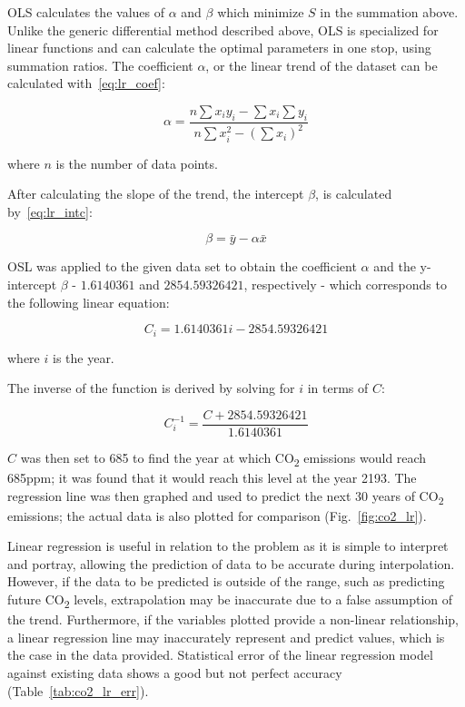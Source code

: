 \documentclass{mcmthesis}
\begin{document}
    OLS calculates the values of $\alpha$ and $\beta$ which minimize $S$ in the summation above.
    Unlike the generic differential method described above, OLS is specialized for linear functions and can calculate the optimal parameters in one stop, using summation ratios.
    The coefficient $\alpha$, or the linear trend of the dataset can be calculated with~\eqref{eq:lr_coef}:

    \begin{equation}
        \alpha = \frac{n \sum x_i y_i - \sum x_i \sum y_i }{n \sum x^2_i - (\sum x_i)^2}
        \label{eq:lr_coef}
    \end{equation}

    \noindent where $n$ is the number of data points.

    After calculating the slope of the trend, the intercept $\beta$, is calculated by~\eqref{eq:lr_intc}:

    \begin{equation}
        \beta = \bar y - \alpha \bar x
        \label{eq:lr_intc}
    \end{equation}

    OSL was applied to the given data set to obtain the coefficient $\alpha$ and the y-intercept $\beta$ - $1.6140361$ and $2854.59326421$, respectively - which corresponds to the following linear equation:

    \begin{equation}
        C_i = 1.6140361 i - 2854.59326421
        \label{eq:co2_lr}
    \end{equation}

    \noindent where $i$ is the year.

    The inverse of the function is derived by solving for $i$ in terms of $C$:

    \begin{equation}
        C^{-1}_i = \frac{C + 2854.59326421}{1.6140361}
        \label{eq:co2_lr_inv}
    \end{equation}

    $C$ was then set to 685 to find the year at which CO\textsubscript{2} emissions would reach 685ppm; it was found that it would reach this level at the year 2193.
    The regression line was then graphed and used to predict the next 30 years of CO\textsubscript{2} emissions; the actual data is also plotted for comparison (Fig.~\ref{fig:co2_lr}).


    Linear regression is useful in relation to the problem as it is simple to interpret and portray, allowing the prediction of data to be accurate during interpolation.
    However, if the data to be predicted is outside of the range, such as predicting future CO\textsubscript{2} levels, extrapolation may be inaccurate due to a false assumption of the trend.
    Furthermore, if the variables plotted provide a non-linear relationship, a linear regression line may inaccurately represent and predict values, which is the case in the data provided.
    Statistical error of the linear regression model against existing data shows a good but not perfect accuracy (Table~\ref{tab:co2_lr_err}).
\end{document}
